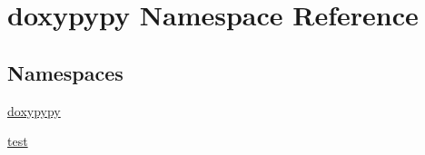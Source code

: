 \hypertarget{namespacedoxypypy}{\section{doxypypy Namespace Reference}
\label{namespacedoxypypy}
}
\subsection*{Namespaces}
\begin{DoxyCompactItemize}
\item 
\hyperlink{namespacedoxypypy_1_1doxypypy}{doxypypy}
\item 
\hyperlink{namespacedoxypypy_1_1test}{test}
\end{DoxyCompactItemize}
